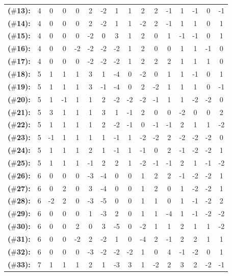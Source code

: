 \begin{table}[ht]
{\begin{tabular}{lc@{\hspace{1em}}ccc@{\hspace{1em}}ccc@{\hspace{1em}}c@{\hspace{1em}}ccc@{\hspace{1em}}ccc@{\hspace{1em}}c}
 \textbf{($\#$13):} & 4 & 0 & 0 & 0 & 2 & -2 & 1 & 1 & 2 & 2 & -1 & 1 & -1 & 0 & -1 \\
 \textbf{($\#$14):} & 4 & 0 & 0 & 0 & 2 & -2 & 1 & 1 & -2 & 2 & -1 & 1 & 1 & 0 & 1 \\
 \textbf{($\#$15):} & 4 & 0 & 0 & 0 & -2 & 0 & 3 & 1 & 2 & 0 & 1 & -1 & -1 & 0 & 1 \\
 \textbf{($\#$16):} & 4 & 0 & 0 & -2 & -2 & -2 & -2 & 1 & 2 & 0 & 0 & 1 & 1 & -1 & 0 \\
 \textbf{($\#$17):} & 4 & 0 & 0 & 0 & -2 & -2 & -2 & 1 & 2 & 2 & 2 & 1 & 1 & 1 & 0 \\
 \textbf{($\#$18):} & 5 & 1 & 1 & 1 & 3 & 1 & -4 & 0 & -2 & 0 & 1 & 1 & -1 & 0 & 1 \\
 \textbf{($\#$19):} & 5 & 1 & 1 & 1 & 3 & -1 & -4 & 0 & 2 & -2 & 1 & 1 & 1 & 0 & -1 \\
 \textbf{($\#$20):} & 5 & 1 & -1 & 1 & 1 & 2 & -2 & -2 & -2 & -1 & 1 & 1 & -2 & -2 & 0 \\
 \textbf{($\#$21):} & 5 & 3 & 1 & 1 & 1 & 3 & 1 & -1 & 2 & 0 & 0 & -2 & 0 & 0 & 2 \\
 \textbf{($\#$22):} & 5 & 1 & 1 & 1 & 1 & 2 & -2 & -1 & 0 & -1 & -1 & 2 & 1 & 1 & -2 \\
 \textbf{($\#$23):} & 5 & -1 & 1 & 1 & 1 & 1 & -1 & 1 & -2 & -2 & 2 & -2 & -2 & -2 & 0 \\
 \textbf{($\#$24):} & 5 & 1 & 1 & 1 & 2 & 1 & -1 & 1 & -1 & 0 & 2 & -1 & -2 & -2 & 1 \\
 \textbf{($\#$25):} & 5 & 1 & 1 & 1 & -1 & 2 & 2 & 1 & -2 & -1 & -1 & 2 & 1 & -1 & -2 \\
 \textbf{($\#$26):} & 6 & 0 & 0 & 0 & -3 & -4 & 0 & 0 & 1 & 2 & 2 & -1 & -2 & -2 & 1 \\
 \textbf{($\#$27):} & 6 & 0 & 2 & 0 & 3 & -4 & 0 & 0 & 1 & 2 & 0 & 1 & -2 & -2 & 1 \\
 \textbf{($\#$28):} & 6 & -2 & 2 & 0 & -3 & -5 & 0 & 0 & 1 & 1 & 0 & 1 & -1 & -2 & 2 \\
 \textbf{($\#$29):} & 6 & 0 & 0 & 0 & 1 & -3 & 2 & 0 & 1 & 1 & -4 & 1 & -1 & -2 & -2 \\
 \textbf{($\#$30):} & 6 & 0 & 0 & 2 & 0 & 3 & -5 & 0 & -2 & 1 & 1 & 2 & 1 & 1 & -2 \\
 \textbf{($\#$31):} & 6 & 0 & 0 & -2 & 2 & -2 & 1 & 0 & -4 & 2 & -1 & 2 & 2 & 1 & 1 \\
 \textbf{($\#$32):} & 6 & 0 & 0 & 0 & -3 & -2 & -2 & -2 & 1 & 0 & 4 & -1 & -2 & 0 & 1 \\
 \textbf{($\#$33):} & 7 & 1 & 1 & 1 & 2 & 1 & -3 & 3 & 1 & -2 & 2 & 3 & 2 & -2 & -1 \\

\end{tabular}}
\end{table}
